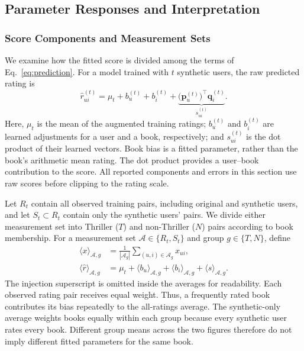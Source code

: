 \subsection{Parameter Responses and Interpretation}
\label{sec:bi-mechanism}

\subsubsection{Score Components and Measurement Sets}

We examine how the fitted score is divided among the terms of Eq.~\eqref{eq:prediction}. For a model trained with $t$ synthetic users, the raw predicted rating is
\begin{equation}
\label{eq:training_score_components}
\hat r_{ui}^{(t)}=\mu_t+b_u^{(t)}+b_i^{(t)}+
\underbrace{\bigl(\mathbf p_u^{(t)}\bigr)^\top\mathbf q_i^{(t)}}_{s_{ui}^{(t)}}.
\end{equation}
Here, $\mu_t$ is the mean of the augmented training ratings; $b_u^{(t)}$ and $b_i^{(t)}$ are learned adjustments for a user and a book, respectively; and $s_{ui}^{(t)}$ is the dot product of their learned vectors. Book bias is a fitted parameter, rather than the book's arithmetic mean rating. The dot product provides a user--book contribution to the score. All reported components and errors in this section use raw scores before clipping to the rating scale.

Let $R_t$ contain all observed training pairs, including original and synthetic users, and let $S_t\subset R_t$ contain only the synthetic users' pairs. We divide either measurement set into Thriller ($T$) and non-Thriller ($N$) pairs according to book membership. For a measurement set $\mathcal A\in\{R_t,S_t\}$ and group $g\in\{T,N\}$, define
\begin{equation}
\label{eq:training_component_average}
\begin{aligned}
\langle x\rangle_{\mathcal A,g}
&=\frac{1}{|\mathcal A_g|}\sum_{(u,i)\in\mathcal A_g}x_{ui},\\
\langle\hat r\rangle_{\mathcal A,g}
&=\mu_t+\langle b_u\rangle_{\mathcal A,g}
+\langle b_i\rangle_{\mathcal A,g}+\langle s\rangle_{\mathcal A,g}.
\end{aligned}
\end{equation}
The injection superscript is omitted inside the averages for readability. Each observed rating pair receives equal weight. Thus, a frequently rated book contributes its bias repeatedly to the all-ratings average. The synthetic-only average weights books equally within each group because every synthetic user rates every book. Different group means across the two figures therefore do not imply different fitted parameters for the same book.

